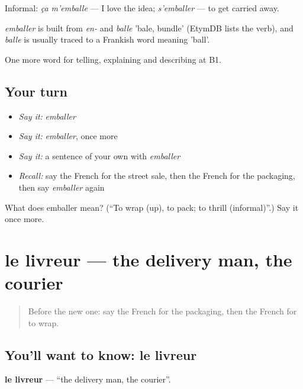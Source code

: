 Informal: \emph{ça m'emballe} — I love the idea; \emph{s'emballer} — to get carried away.

\begin{cousinweb}
\emph{emballer} is built from \emph{en-} and \emph{balle} 'bale, bundle' (EtymDB lists the verb), and \emph{balle} is usually traced to a Frankish word meaning 'ball'.
\end{cousinweb}

\begin{grammarlens}[title={What you've built}]
One more word for telling, explaining and describing at B1.
\end{grammarlens}

\subsection*{Your turn}
\begin{itemize}
\raggedright
  \item \emph{Say it:} \emph{emballer}
  \item \emph{Say it:} \emph{emballer}, once more
  \item \emph{Say it:} a sentence of your own with \emph{emballer}
  \item \emph{Recall:} say the French for the street sale, then the French for the packaging, then say \emph{emballer} again
\end{itemize}

\begin{tcolorbox}[breakable,colback=teal!4,colframe=teal!35!black,title={Before you move on}]
What does emballer mean? (\textquotedblleft{}To wrap (up), to pack; to thrill (informal)\textquotedblright{}.) Say it once more.
\end{tcolorbox}
\section[le livreur]{le livreur — the delivery man, the courier}

\label{lesson:FR-C453-livreur}



\begin{quote}
Before the new one: say the French for the packaging, then the French for to wrap.
\end{quote}

\subsection*{You'll want to know: le livreur}
\textbf{le livreur} — \textquotedblleft{}the delivery man, the courier\textquotedblright{}.

